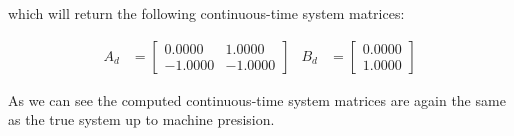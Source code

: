 which will return the following continuous-time system matrices:

\begin{align*}
A_d &= \begin{bmatrix} 0.0000 & 1.0000 \\ -1.0000 & -1.0000 \end{bmatrix} &
B_d &= \begin{bmatrix} 0.0000 \\ 1.0000 \end{bmatrix} 
\end{align*}

As we can see the computed continuous-time system matrices are again the same as the true system up to machine presision.
